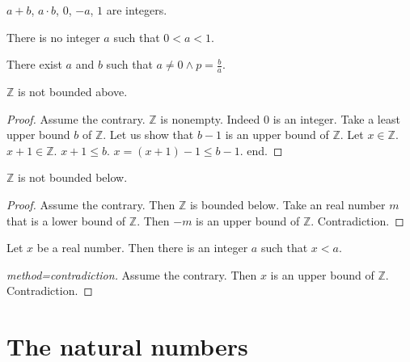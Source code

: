 \documentclass[english]{article}
\begin{document}
\begin{forthel}

\begin{axiom}
$a + b$, $a \cdot b$, $0$, $-a$, $1$ are integers.
\end{axiom}

\begin{axiom}
There is no integer $a$ such that $0 < a < 1$.
\end{axiom}

\begin{axiom}
There exist $a$ and $b$ such that
$a \neq 0 \wedge p = \frac{b}{a}$.
\end{axiom}

\begin{theorem}[id=Archimedes_1,title=Archimedes 1]
$\mathbb{Z}$ is not bounded above.
\end{theorem}
\begin{proof}
Assume the contrary.
$\mathbb{Z}$ is nonempty. Indeed $0$ is an integer.
Take a least upper bound
$b$ of $\mathbb{Z}$.
Let us show that $b - 1$ is an upper bound of $\mathbb{Z}$.
Let $x \in \mathbb{Z}$. $x + 1 \in \mathbb{Z}$.
$x + 1 \leq b$.
$x = (x + 1) - 1 \leq b - 1$.
end.
\end{proof}

\begin{theorem}
$\mathbb{Z}$ is not bounded below.
\end{theorem}
\begin{proof}
Assume the contrary.
Then $\mathbb{Z}$ is bounded below.
Take an real number $m$ that is a lower bound of $\mathbb{Z}$.
Then $-m$ is an upper bound of $\mathbb{Z}$.
Contradiction.
\end{proof}

\begin{theorem}[id=Archimedes_2,title=Archimedes 2]
Let $x$ be a real number.
Then there is an integer $a$
such that $x < a$.
\end{theorem}
\begin{proof}[method=contradiction]
Assume the contrary.
Then $x$ is an upper bound of $\mathbb{Z}$.
Contradiction.
\end{proof}

\end{forthel}


\section{The natural numbers}
\end{document}
